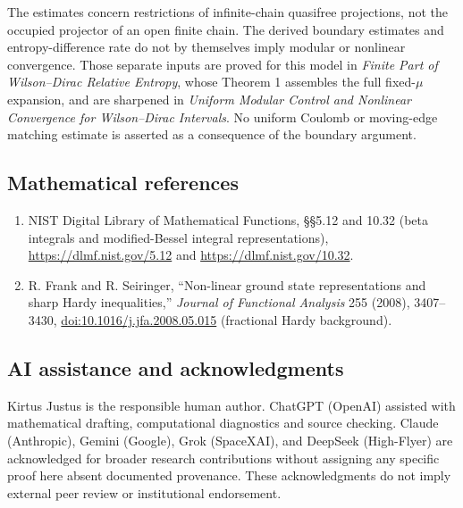 \documentclass[
  10pt,
  a4paper,
]{article}
\providecommand{\tightlist}{%
  \setlength{\itemsep}{0pt}\setlength{\parskip}{0pt}}
\begin{document}
The estimates concern restrictions of infinite-chain quasifree projections, not the occupied projector of an open finite chain. The derived boundary estimates and entropy-difference rate do not by themselves imply modular or nonlinear convergence. Those separate inputs are proved for this model in \emph{Finite Part of Wilson--Dirac Relative Entropy}, whose Theorem 1 assembles the full fixed-\(\mu\) expansion, and are sharpened in \emph{Uniform Modular Control and Nonlinear Convergence for Wilson--Dirac Intervals}. No uniform Coulomb or moving-edge matching estimate is asserted as a consequence of the boundary argument.

\subsection{Mathematical references}\label{mathematical-references}

\begin{enumerate}
\def\labelenumi{\arabic{enumi}.}
\tightlist
\item
  NIST Digital Library of Mathematical Functions, §§5.12 and 10.32 (beta integrals and modified-Bessel integral representations), \url{https://dlmf.nist.gov/5.12} and \url{https://dlmf.nist.gov/10.32}.
\item
  R. Frank and R. Seiringer, ``Non-linear ground state representations and sharp Hardy inequalities,'' \emph{Journal of Functional Analysis} 255 (2008), 3407--3430, \url{doi:10.1016/j.jfa.2008.05.015} (fractional Hardy background).
\end{enumerate}

\subsection{AI assistance and acknowledgments}\label{ai-assistance-and-acknowledgments}

Kirtus Justus is the responsible human author. ChatGPT (OpenAI) assisted with mathematical drafting, computational diagnostics and source checking. Claude (Anthropic), Gemini (Google), Grok (SpaceXAI), and DeepSeek (High-Flyer) are acknowledged for broader research contributions without assigning any specific proof here absent documented provenance. These acknowledgments do not imply external peer review or institutional endorsement.
\end{document}
